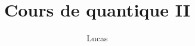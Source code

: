 \documentclass[a4paper,12pt]{book}
\begin{document}
\newtheorem*{thm}{Théorème}

\newtheorem*{definition}{Définition}
\author{Lucas}
\title{Cours de quantique II}


\frontmatter
\maketitle
\tableofcontents

\mainmatter


\backmatter
\end{document}
